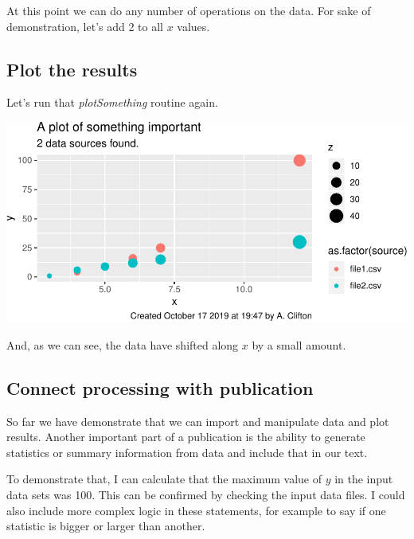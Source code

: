 \documentclass[10pt,]{article}
\newenvironment{Shaded}{\begin{snugshade}}{\end{snugshade}}
\newcommand{\FloatTok}[1]{\textcolor[rgb]{0.00,0.00,0.81}{#1}}
\newcommand{\NormalTok}[1]{#1}
\newcommand{\OperatorTok}[1]{\textcolor[rgb]{0.81,0.36,0.00}{\textbf{#1}}}
\newcommand{\StringTok}[1]{\textcolor[rgb]{0.31,0.60,0.02}{#1}}
\begin{document}
At this point we can do any number of operations on the data. For sake of demonstration, let's add 2 to all \(x\) values.

\begin{Shaded}
\end{Shaded}

\hypertarget{plot-the-results}{%
\subsection{Plot the results}\label{plot-the-results}}

Let's run that \emph{plotSomething} routine again.

\includegraphics{main_files/figure-latex/plot modified data-1.pdf}

And, as we can see, the data have shifted along \(x\) by a small amount.

\hypertarget{connect-processing-with-publication}{%
\subsection{Connect processing with publication}\label{connect-processing-with-publication}}

So far we have demonstrate that we can import and manipulate data and plot results. Another important part of a publication is the ability to generate statistics or summary information from data and include that in our text.

To demonstrate that, I can calculate that the maximum value of \(y\) in the input data sets was 100. This can be confirmed by checking the input data files. I could also include more complex logic in these statements, for example to say if one statistic is bigger or larger than another.
\end{document}
